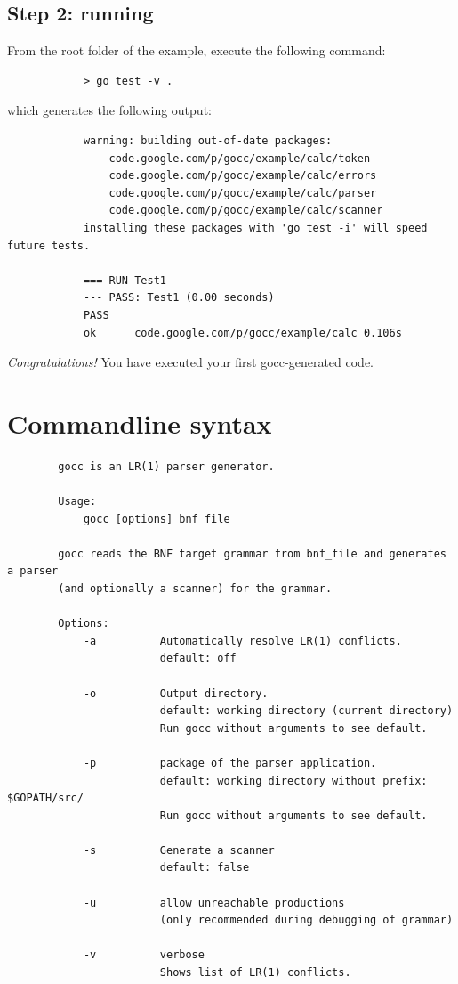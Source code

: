\documentclass[12pt]{article}
\begin{document}
	\subsection{Step 2: running }
		From the root folder of the  example, execute the following command:

		\begin{verbatim}
			> go test -v .
		\end{verbatim}

		which generates the following output:

		\begin{verbatim}
			warning: building out-of-date packages:
			    code.google.com/p/gocc/example/calc/token
			    code.google.com/p/gocc/example/calc/errors
			    code.google.com/p/gocc/example/calc/parser
			    code.google.com/p/gocc/example/calc/scanner
			installing these packages with 'go test -i' will speed future tests.

			=== RUN Test1
			--- PASS: Test1 (0.00 seconds)
			PASS
			ok  	code.google.com/p/gocc/example/calc	0.106s		\end{verbatim}

		{\em Congratulations!} You have executed your first gocc-generated code.

\section{Commandline syntax}\label{sec:commandline}
	\begin{verbatim}
		gocc is an LR(1) parser generator.

		Usage:
		    gocc [options] bnf_file

		gocc reads the BNF target grammar from bnf_file and generates a parser 
		(and optionally a scanner) for the grammar.

		Options:
		    -a          Automatically resolve LR(1) conflicts.
		                default: off

		    -o          Output directory.
		                default: working directory (current directory)
		                Run gocc without arguments to see default.

		    -p          package of the parser application.
		                default: working directory without prefix: $GOPATH/src/
		                Run gocc without arguments to see default.

		    -s          Generate a scanner
		                default: false

		    -u          allow unreachable productions 
		                (only recommended during debugging of grammar)

		    -v          verbose
		                Shows list of LR(1) conflicts.
	\end{verbatim}
\end{document}
